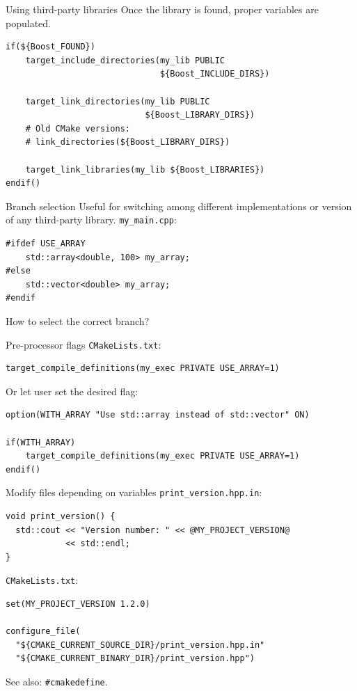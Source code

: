 \documentclass[aspectratio=169,11pt]{beamer}
\begin{document}
\begin{frame}[fragile]{Using third-party libraries}
Once the library is found, proper variables are populated.
\begin{verbatim}
if(${Boost_FOUND})
    target_include_directories(my_lib PUBLIC
                               ${Boost_INCLUDE_DIRS})
    
    target_link_directories(my_lib PUBLIC
                            ${Boost_LIBRARY_DIRS})
    # Old CMake versions:
    # link_directories(${Boost_LIBRARY_DIRS})
    
    target_link_libraries(my_lib ${Boost_LIBRARIES})
endif()
\end{verbatim}
\end{frame}

\begin{frame}[fragile]{Branch selection}
Useful for switching among different implementations or version of any third-party library.
\vfill
\texttt{my\_main.cpp}:
\begin{verbatim}
#ifdef USE_ARRAY
    std::array<double, 100> my_array;
#else
    std::vector<double> my_array;
#endif
\end{verbatim}

How to select the correct branch?
\end{frame}

\begin{frame}[fragile]{Pre-processor flags}
\texttt{CMakeLists.txt}:
\begin{verbatim}
target_compile_definitions(my_exec PRIVATE USE_ARRAY=1)
\end{verbatim}
Or let user set the desired flag:
\begin{verbatim}
option(WITH_ARRAY "Use std::array instead of std::vector" ON)

if(WITH_ARRAY)
    target_compile_definitions(my_exec PRIVATE USE_ARRAY=1)
endif()
\end{verbatim}
\end{frame}

\begin{frame}[fragile]{Modify files depending on variables}
\texttt{print\_version.hpp.in}:
\begin{verbatim}
void print_version() {
  std::cout << "Version number: " << @MY_PROJECT_VERSION@
            << std::endl;
}
\end{verbatim}
\texttt{CMakeLists.txt}:
\begin{verbatim}
set(MY_PROJECT_VERSION 1.2.0)

configure_file(
  "${CMAKE_CURRENT_SOURCE_DIR}/print_version.hpp.in"
  "${CMAKE_CURRENT_BINARY_DIR}/print_version.hpp")
\end{verbatim}
See also: \texttt{\#cmakedefine}.
\end{frame}
\end{document}
